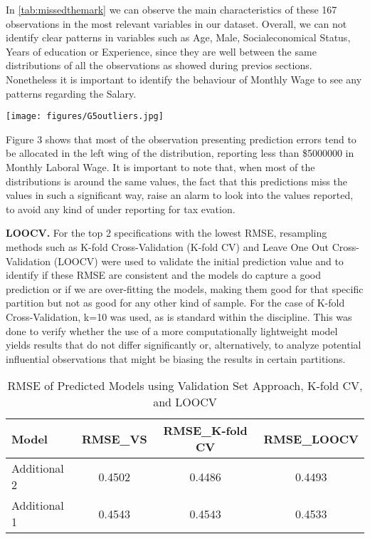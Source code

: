 \documentclass[12pt,a4paper,onecolumn]{article}
\begin{document}
In \autoref{tab:missedthemark} we can observe the main characteristics of these 167 observations in the most relevant variables in our dataset. Overall, we can not identify clear patterns in variables such as Age, Male, Socialeconomical Status, Years of education or Experience, since they are well between the same distributions of all the observations as showed during previos sections. Nonetheless it is important to identify the behaviour of Monthly Wage to see any patterns regarding the Salary.\\

\begin{center}
  \captionsetup{type=figure,position=top}
  \label{fig:agecurve3}

  \texttt{[image: figures/G5outliers.jpg]}
\end{center}

  Figure 3 shows that most of the observation presenting prediction errors tend to be allocated in the left wing of the distribution, reporting less than \$5000000 in Monthly Laboral Wage. It is important to note that, when most of the distributions is around the same values, the fact that this predictions miss the values in such a significant way, raise an alarm to look into the values reported, to avoid any kind of under reporting for tax evation.
  
\textbf{LOOCV.} For the top 2 specifications with the lowest RMSE, resampling methods such as K-fold Cross-Validation (K-fold CV) and Leave One Out Cross-Validation (LOOCV) were used to validate the initial prediction value and to identify if these RMSE are consistent and the models do capture a good prediction or if we are over-fitting the models, making them good for that specific partition but not as good for any other kind of sample. For the case of K-fold Cross-Validation, k=10 was used, as is standard within the discipline. This was done to verify whether the use of a more computationally lightweight model yields results that do not differ significantly or, alternatively, to analyze potential influential observations that might be biasing the results in certain partitions.

\begin{table}[h!]
\caption{RMSE of Predicted Models using Validation Set Approach, K-fold CV, and LOOCV}
\label{tab:rmse_vsloocv}
\centering
\renewcommand{\arraystretch}{1.15}
\begin{tabular}{l c c c}
\toprule
Model & RMSE\_VS & RMSE\_K-fold CV & RMSE\_LOOCV \\
\midrule
Additional 2& 0.4502 & 0.4486 & 0.4493 \\
Additional 1 & 0.4543 & 0.4543 & 0.4533 \\
\bottomrule
\end{tabular}
\end{table}
\end{document}
